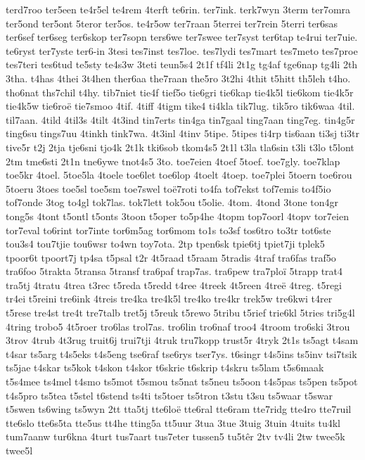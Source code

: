 {terd7roo
ter5een
te4r5el
te4rem
4terft
te6rin.
ter7ink.
terk7wyn
3term
ter7omra
ter5ond
ter5ont
5teror
ter5os.
te4r5ow
ter7raan
5terrei
ter7rein
5terri
ter6sas
ter6sef
ter6seg
ter6skop
ter7sopn
ters6we
ter7swee
ter7syst
ter6tap
te4rui
ter7uie.
te6ryst
ter7yste
ter6-in
3tesi
tes7inst
tes7loe.
tes7lydi
tes7mart
tes7meto
tes7proe
tes7teri
tes6tud
te5sty
te4s3w
3teti
teun5s4
2t1f
tf4li
2t1g
tg4af
tge6nap
tg4li
2th
3tha.
t4has
4thei
3t4hen
ther6aa
the7raan
the5ro
3t2hi
4thit
t5hitt
th5leh
t4ho.
tho6nat
ths7chil
t4hy.
tib7niet
tie4f
tief5o
tie6gri
tie6kap
tie4k5l
tie6kom
tie4k5r
tie4k5w
tie6roë
tie7smoo
4tif.
4tiff
4tigm
tike4
ti4kla
tik7lug.
tik5ro
tik6waa
4til.
til7aan.
4tild
4til3s
4tilt
4t3ind
tin7erts
tin4ga
tin7gaal
ting7aan
ting7eg.
tin4g5r
ting6su
tings7uu
4tinkh
tink7wa.
4t3inl
4tinv
5tipe.
5tipes
ti4rp
tis6aan
ti3sj
ti3tr
tive5r
t2j
2tja
tje6sni
tjo4k
2t1k
tki6sob
tkom4s5
2t1l
t3la
tla6sin
t3li
t3lo
t5lont
2tm
tme6sti
2t1n
tne6ywe
tnot4s5
3to.
toe7eien
4toef
5toef.
toe7gly.
toe7klap
toe5kr
4toel.
5toe5la
4toele
toe6let
toe6lop
4toelt
4toep.
toe7plei
5toern
toe6rou
5toeru
3toes
toe5sl
toe5sm
toe7swel
toë7roti
to4fa
tof7ekst
tof7emis
to4f5io
tof7onde
3tog
to4gl
tok7las.
tok7lett
tok5ou
t5olie.
4tom.
4tond
3tone
ton4gr
tong5s
4tont
t5ontl
t5onts
3toon
t5oper
to5p4he
4topm
top7oorl
4topv
tor7eien
tor7eval
to6rint
tor7inte
tor6m5ag
tor6mom
to1s
to3sf
tos6tro
to3tr
tot6ste
tou3s4
tou7tjie
tou6wsr
to4wn
toy7ota.
2tp
tpen6sk
tpie6tj
tpiet7ji
tplek5
tpoor6t
tpoort7j
tp4sa
t5psal
t2r
4t5raad
t5raam
5tradis
4traf
tra6fas
traf5o
tra6foo
5trakta
5transa
5transf
tra6paf
trap7as.
tra6pew
tra7ploï
5trapp
trat4
tra5tj
4tratu
4trea
t3rec
t5reda
t5redd
t4ree
4treek
4t5reen
4treë
4treg.
t5regi
tr4ei
t5reini
tre6ink
4treis
tre4ka
tre4k5l
tre4ko
tre4kr
trek5w
tre6kwi
t4rer
t5rese
tre4st
tre4t
tre7talb
tret5j
t5reuk
t5rewo
5tribu
t5rief
trie6kl
5tries
tri5g4l
4tring
trobo5
4t5roer
tro6las
trol7as.
tro6lin
tro6naf
troo4
4troom
tro6ski
3trou
3trov
4trub
4t3rug
truit6j
trui7tji
4truk
tru7kopp
trust5r
4tryk
2t1s
ts5agt
t4sam
t4sar
ts5arg
t4s5eks
t4s5eng
tse6raf
tse6rys
tser7ys.
t6singr
t4s5ins
ts5inv
tsi7tsik
ts5jae
t4skar
ts5kok
t4skon
t4skor
t6skrie
t6skrip
t4skru
ts5lam
t5s6maak
t5s4mee
ts4mel
t4smo
ts5mot
t5smou
ts5nat
ts5neu
ts5oon
t4s5pas
ts5pen
ts5pot
t4s5pro
ts5tea
t5stel
t6stend
ts4ti
ts5toer
ts5tron
t3stu
t3su
ts5waar
t5swar
t5swen
ts6wing
ts5wyn
2tt
tta5tj
tte6loë
tte6ral
tte6ram
tte7ridg
tte4ro
tte7ruil
tte6slo
tte6s5ta
tte5us
tt4he
tting5a
tt5uur
3tua
3tue
3tuig
3tuin
4tuits
tu4kl
tum7aanw
tur6kna
4turt
tus7aart
tus7eter
tussen5
tu5têr
2tv
tv4li
2tw
twee5k
twee5l
}
